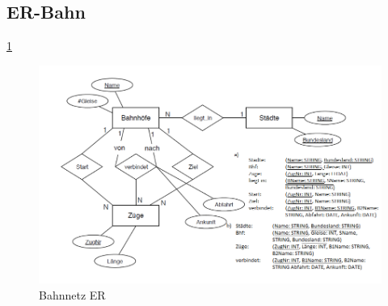 \subsection{ER-Bahn}
\ref{img:Bahn-ER}
\begin{figure}
	\centering
	\includegraphics[width = 16cm]{./Database/Images/2_2.png}
	\caption{Bahnnetz ER}
	\label{img:Bahn-ER}
\end{figure}
